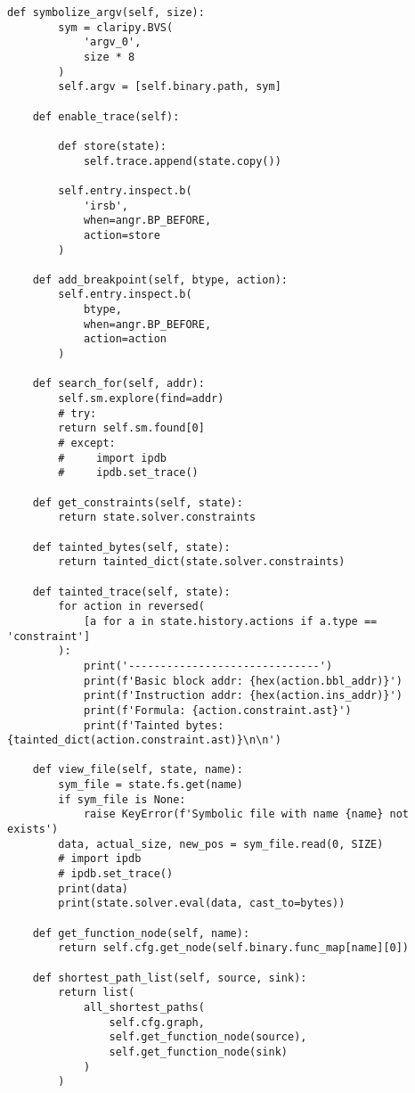 \begin{lstlisting}[environoment=py_code, caption=an, captionpos=b]
    def symbolize_argv(self, size):
        sym = claripy.BVS(
            'argv_0',
            size * 8
        )
        self.argv = [self.binary.path, sym]

    def enable_trace(self):

        def store(state):
            self.trace.append(state.copy())

        self.entry.inspect.b(
            'irsb',
            when=angr.BP_BEFORE,
            action=store
        )

    def add_breakpoint(self, btype, action):
        self.entry.inspect.b(
            btype,
            when=angr.BP_BEFORE,
            action=action
        )

    def search_for(self, addr):
        self.sm.explore(find=addr)
        # try:
        return self.sm.found[0]
        # except:
        #     import ipdb
        #     ipdb.set_trace()

    def get_constraints(self, state):
        return state.solver.constraints

    def tainted_bytes(self, state):
        return tainted_dict(state.solver.constraints)

    def tainted_trace(self, state):
        for action in reversed(
            [a for a in state.history.actions if a.type == 'constraint']
        ):
            print('------------------------------')
            print(f'Basic block addr: {hex(action.bbl_addr)}')
            print(f'Instruction addr: {hex(action.ins_addr)}')
            print(f'Formula: {action.constraint.ast}')
            print(f'Tainted bytes: {tainted_dict(action.constraint.ast)}\n\n')

    def view_file(self, state, name):
        sym_file = state.fs.get(name)
        if sym_file is None:
            raise KeyError(f'Symbolic file with name {name} not exists')
        data, actual_size, new_pos = sym_file.read(0, SIZE)
        # import ipdb
        # ipdb.set_trace()
        print(data)
        print(state.solver.eval(data, cast_to=bytes))

    def get_function_node(self, name):
        return self.cfg.get_node(self.binary.func_map[name][0])

    def shortest_path_list(self, source, sink):
        return list(
            all_shortest_paths(
                self.cfg.graph,
                self.get_function_node(source),
                self.get_function_node(sink)
            )
        )




\end{lstlisting}

